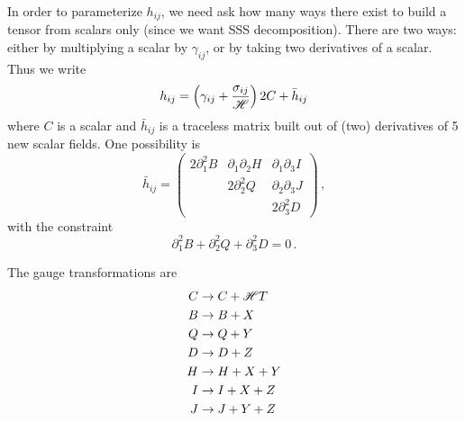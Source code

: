 \documentclass{article}
\begin{document}
In order to parameterize $h_{ij}$, we need ask how many ways there
exist to build a tensor from scalars only (since we want SSS decomposition).
There are two ways: either by multiplying a scalar by $\gamma_{ij}$,
or by taking two derivatives of a scalar. Thus we write
\[
h_{ij}=\left(\gamma_{ij}+\frac{\sigma_{ij}}{{\cal H}}\right)2C+\bar{h}_{ij}
\]
where $C$ is a scalar and $\bar{h}_{ij}$ is a traceless matrix built
out of (two) derivatives of 5 new scalar fields. One possibility is
\[
\bar{h}_{ij}=\left(\begin{array}{ccc}
2\partial_{1}^{2}B & \partial_{1}\partial_{2}H & \partial_{1}\partial_{3}I\\
 & 2\partial_{2}^{2}Q & \partial_{2}\partial_{3}J\\
 &  & 2\partial_{3}^{2}D
\end{array}\right)\,,
\]
with the constraint
\[
\partial_{1}^{2}B+\partial_{2}^{2}Q+\partial_{3}^{2}D=0\,.
\]


The gauge transformations are
\begin{align*}
C & \rightarrow C+{\cal H}T\\
B & \rightarrow B+X\\
Q & \rightarrow Q+Y\\
D & \rightarrow D+Z\\
H & \rightarrow H+X+Y\\
I & \rightarrow I+X+Z\\
J & \rightarrow J+Y+Z
\end{align*}
\end{document}
